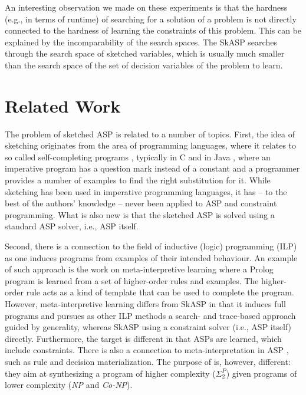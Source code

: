 An interesting observation we made on these experiments is that the 
hardness (e.g., in terms of runtime) of searching for a solution of 
a problem is not directly connected to the hardness of learning the 
constraints of this problem. This can be explained by the incomparability of the search spaces. 
The SkASP searches through the search space of sketched variables, 
which is usually much smaller than  the search space of the set of decision variables 
of the problem to learn.

\section{Related Work}\label{sec:related_work}
The problem of sketched ASP is related to a number of topics.
First, the idea of sketching originates from the area of programming languages, where
it relates to so called self-completing programs \parencite{sketching_phd_thesis}, typically in C \parencite{sketching_original} and in Java \parencite{jsketch}, where an imperative program has a question mark instead of a constant and a programmer provides a number of examples to find the right substitution for it. While sketching has been used in imperative programming languages, it has -- to the best of the authors' knowledge -- never been applied to ASP and constraint programming.  What is also new is that the sketched ASP is solved using a standard ASP solver, i.e., ASP itself.

Second, there is a connection to the field of inductive (logic) programming (ILP)  \parencite{ilp_book,ilp_original,gulwani2015inductive}
as one induces programs from examples of their intended behaviour.  
An example of such approach is the work on meta-interpretive learning \parencite{MuggletonMLJ14,MuggletonMLJ15} where 
a Prolog program is learned from a set of higher-order rules and examples. The higher-order rule acts as a kind of template
that can be used to complete the program. 
However, meta-interpretive learning differs from SkASP in that it induces full programs 
and pursues as other ILP methods a search- and trace-based approach guided by generality, 
whereas SkASP using a constraint solver (i.e., ASP itself) directly.  Furthermore, the target is different in that ASPs are learned, which include constraints. %
There is also a connection to meta-interpretation in ASP \parencite{asp_meta}, such as rule and decision materialization. The purpose of is, however, different: they aim at synthesizing a program of higher complexity ($\Sigma_2^P$) given programs of lower complexity (\textit{NP} and \textit{Co-NP}).

